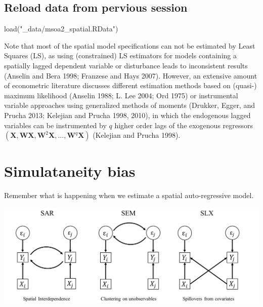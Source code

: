 \documentclass[
  letterpaper,
  DIV=11,
  numbers=noendperiod]{scrreprt}
\newenvironment{Shaded}{\begin{snugshade}}{\end{snugshade}}
\newcommand{\FunctionTok}[1]{\textcolor[rgb]{0.28,0.35,0.67}{#1}}
\newcommand{\NormalTok}[1]{\textcolor[rgb]{0.00,0.23,0.31}{#1}}
\newcommand{\StringTok}[1]{\textcolor[rgb]{0.13,0.47,0.30}{#1}}
\begin{document}
\hypertarget{reload-data-from-pervious-session-5}{%
\subsection*{Reload data from pervious
session}\label{reload-data-from-pervious-session-5}}

\begin{Shaded}
\begin{Highlighting}[]
\FunctionTok{load}\NormalTok{(}\StringTok{"\_data/msoa2\_spatial.RData"}\NormalTok{)}
\end{Highlighting}
\end{Shaded}

Note that most of the spatial model specifications can not be estimated
by Least Squares (LS), as using (constrained) LS estimators for models
containing a spatially lagged dependent variable or disturbance leads to
inconsistent results (Anselin and Bera 1998; Franzese and Hays 2007).
However, an extensive amount of econometric literature discusses
different estimation methods based on (quasi-) maximum likelihood
(Anselin 1988; L. Lee 2004; Ord 1975) or instrumental variable
approaches using generalized methods of moments (Drukker, Egger, and
Prucha 2013; Kelejian and Prucha 1998, 2010), in which the endogenous
lagged variables can be instrumented by \(q\) higher order lags of the
exogenous regressors
\(({\boldsymbol{\mathbf{X}}}, {\boldsymbol{\mathbf{W}} \boldsymbol{\mathbf{X}}}, {\boldsymbol{\mathbf{W}}^2 \boldsymbol{\mathbf{X}}},..., {\boldsymbol{\mathbf{W}}^q \boldsymbol{\mathbf{X}}})\)
(Kelejian and Prucha 1998).

\hypertarget{simulataneity-bias}{%
\section{Simulataneity bias}\label{simulataneity-bias}}

Remember what is happening when we estimate a spatial auto-regressive
model.

\includegraphics{fig/Graph.jpg}
\end{document}
